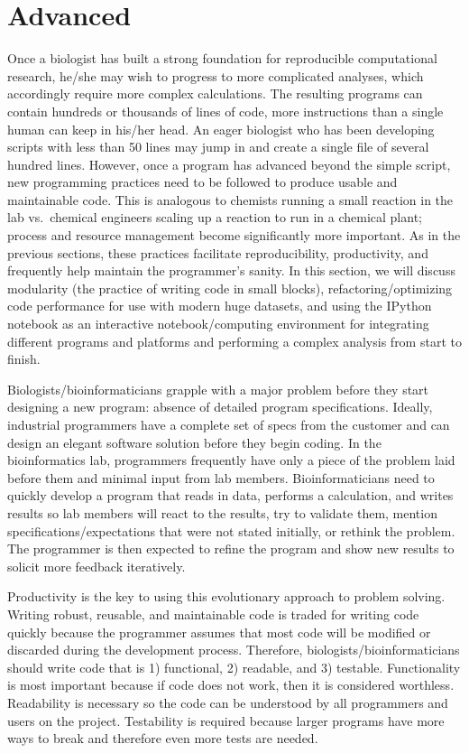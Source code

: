 \documentclass[ChapterTOCs,krantz2]{krantz} %
\begin{document}
\section{Advanced}

Once a biologist has built a strong foundation for reproducible computational
research, he/she may wish to progress to more complicated analyses, which
accordingly require more complex calculations.  The resulting programs can
contain hundreds or thousands of lines of code, more instructions than a single
human can keep in his/her head.  An eager biologist who has been developing 
scripts with less than 50 lines may jump in and create a single file of
several hundred lines.  However, once a program has advanced beyond the
simple script, new programming practices need to be followed to produce usable
and maintainable code.  This is analogous to chemists running a small reaction
in the lab vs.\ chemical engineers scaling up a reaction to run in a chemical
plant; process and resource management become significantly more important.  As in the
previous sections, these practices facilitate reproducibility,
productivity, and frequently help maintain the programmer's sanity.  In this
section, we will discuss modularity (the practice of writing code in small blocks), refactoring/optimizing code performance for use with
modern huge datasets, and using the IPython notebook as an interactive
notebook/computing environment for integrating different programs and platforms
and performing a complex analysis from start to finish.

Biologists/bioinformaticians grapple with a major problem before they start 
designing a new program:
absence of detailed program specifications\cite{Segal2007}.  Ideally, industrial
programmers have a complete set of specs from the customer 
and can design an elegant software solution before they begin
coding.  In the bioinformatics lab, programmers frequently have only a piece of
the problem laid before them and minimal input from lab members.  
Bioinformaticians need to quickly
develop a program that reads in data, performs a calculation, and writes
results so lab members will react to the results, try to validate them, mention
specifications/expectations that were not stated initially, or
rethink the problem.  The programmer is then
expected to refine the program and show new results to
solicit more feedback iteratively. 

Productivity is the key to using this evolutionary approach to problem solving.  
Writing robust, reusable, and maintainable code is traded for
writing code quickly because the programmer assumes that most code will be
modified or discarded during the development process.  Therefore,
biologists/bioinformaticians should write code that is 1) functional, 2)
readable, and 3) testable.  Functionality is most important because if code
does not work, then it is considered worthless\cite{Kelly2008}.
Readability is necessary so the code can be understood by all programmers and users
on the project.  
Testability is required
because larger programs have more ways to break and therefore even more tests
are needed.
\end{document}

